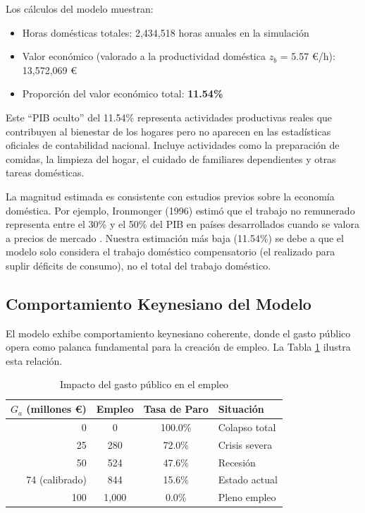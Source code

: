 Los cálculos del modelo muestran:

\begin{itemize}
    \item Horas domésticas totales: 2,434,518 horas anuales en la simulación
    \item Valor económico (valorado a la productividad doméstica $z_b$ = 5.57 €/h): 13,572,069 €
    \item Proporción del valor económico total: \textbf{11.54\%}
\end{itemize}

Este ``PIB oculto'' del 11.54\% representa actividades productivas reales que contribuyen al bienestar de los hogares pero no aparecen en las estadísticas oficiales de contabilidad nacional. Incluye actividades como la preparación de comidas, la limpieza del hogar, el cuidado de familiares dependientes y otras tareas domésticas.

La magnitud estimada es consistente con estudios previos sobre la economía doméstica. Por ejemplo, Ironmonger (1996) estimó que el trabajo no remunerado representa entre el 30\% y el 50\% del PIB en países desarrollados cuando se valora a precios de mercado \cite{ironmonger1996counting}. Nuestra estimación más baja (11.54\%) se debe a que el modelo solo considera el trabajo doméstico compensatorio (el realizado para suplir déficits de consumo), no el total del trabajo doméstico.

\subsection{Comportamiento Keynesiano del Modelo}

El modelo exhibe comportamiento keynesiano coherente, donde el gasto público opera como palanca fundamental para la creación de empleo. La Tabla \ref{tab:keynes} ilustra esta relación.

\begin{table}[h]
\centering
\caption{Impacto del gasto público en el empleo}
\label{tab:keynes}
\begin{tabular}{rccl}
\toprule
\textbf{$G_a$ (millones €)} & \textbf{Empleo} & \textbf{Tasa de Paro} & \textbf{Situación} \\
\midrule
0 & 0 & 100.0\% & Colapso total \\
25 & 280 & 72.0\% & Crisis severa \\
50 & 524 & 47.6\% & Recesión \\
74 (calibrado) & 844 & 15.6\% & Estado actual \\
100 & 1,000 & 0.0\% & Pleno empleo \\
\bottomrule
\end{tabular}
\end{table}

